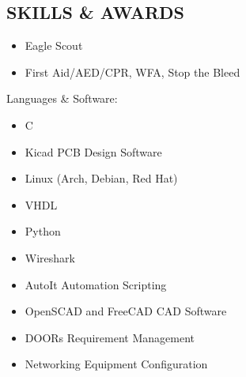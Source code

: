 \documentclass[line,mmmargin]{res}
\begin{document}
\begin{resume}
\section{SKILLS \& AWARDS} 
		\begin{multicols}{2}
			\begin{itemize}
				\itemsep -2pt
				\item[] Eagle Scout
                \item[] First Aid/AED/CPR, WFA, Stop the Bleed
			\end{itemize}
		\end{multicols}
	\vspace{-10pt}
	{Languages \& Software:} %
		\begin{multicols}{2}
			\begin{itemize}
				\itemsep -2pt
				\item[] C
				\item[] Kicad PCB Design Software
                \item[] Linux (Arch, Debian, Red Hat)
				\item[] VHDL
				\item[] Python
				\item[] Wireshark
				\item[] AutoIt Automation Scripting
				\item[] OpenSCAD and FreeCAD CAD Software
				\item[] DOORs Requirement Management
				\item[] Networking Equipment Configuration


\end{itemize}
\end{multicols}
\end{resume}
\end{document}
